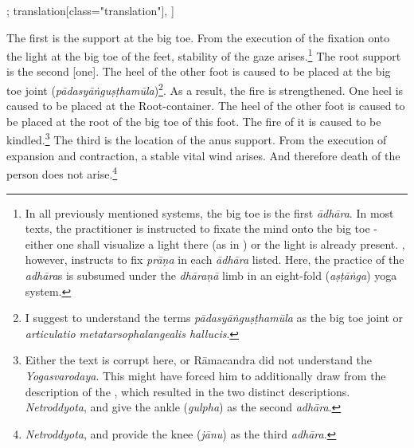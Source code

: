 \begin{alignment}[
  texts=edition[class="edition"];
  translation[class="translation"],
  ]
\begin{translation}
\begin{tlate}[p30_01]
The first is the support at the big toe. From the execution of the fixation onto the light at the big toe of the feet, stability of the gaze arises.\footnote{In all previously mentioned systems, the big toe is the first \textit{ādhāra}. In most texts, the practitioner is instructed to fixate the mind onto the big toe - either one shall visualize a light there (as in ) or the light is already present. , however, instructs to fix \textit{prāṇa} in each \textit{ādhāra} listed. Here, the practice of the \textit{adhāra}s is subsumed under the \textit{dhāraṇā} limb in an eight-fold (\textit{aṣṭāṅga}) yoga system.}  
      The root support is the second [one]. The heel of the other foot is caused to be placed at the big toe joint (\textit{pādasyāṅguṣṭhamūla})\footnote{I suggest to understand the terms \textit{pādasyāṅguṣṭhamūla} as the big toe joint or \textit{articulatio metatarsophalangealis hallucis}.}. As a result, the fire is strengthened. One heel is caused to be placed at the Root-container. The heel of the other foot is caused to be placed at the root of the big toe of this foot. The fire of it is caused to be kindled.\footnote{Either the text is corrupt here, or Rāmacandra did not understand the \textit{Yogasvarodaya}. This might have forced him to additionally draw from the description of the , which resulted in the two distinct descriptions. \textit{Netroddyota},  and  give the ankle (\textit{gulpha}) as the second \textit{adhāra}.}  
      The third is the location of the anus support. From the execution of expansion and contraction, a stable vital wind arises. And therefore death of the person does not arise.\footnote{\textit{Netroddyota},  and  provide the knee (\textit{jānu}) as the third \textit{adhāra}.}
    \end{tlate}
  \end{translation}
\end{alignment}
\pagebreak %
